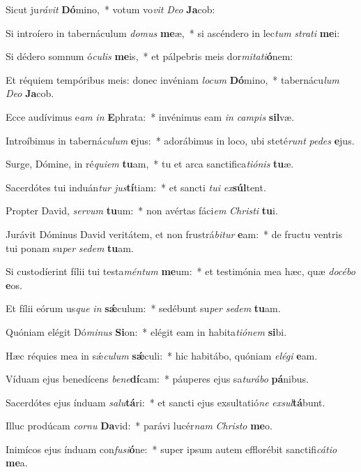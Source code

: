 \item Sicut ju\textit{rá}\textit{vit} \textbf{Dó}mino,~* votum vo\textit{vit} \textit{De}\textit{o} \textbf{Ja}cob:
\item Si introíero in tabernáculum \textit{do}\textit{mus} \textbf{me}æ,~* si ascéndero in lec\textit{tum} \textit{stra}\textit{ti} \textbf{me}i:
\item Si dédero somnum ó\textit{cu}\textit{lis} \textbf{me}is,~* et pálpebris meis dor\textit{mi}\textit{ta}\textit{ti}\textbf{ó}nem:
\item Et réquiem tempóribus meis: donec invéniam \textit{lo}\textit{cum} \textbf{Dó}mino,~* tabernácu\textit{lum} \textit{De}\textit{o} \textbf{Ja}cob.
\item Ecce audívimus e\textit{am} \textit{in} \textbf{E}phrata:~* invénimus eam \textit{in} \textit{cam}\textit{pis} \textbf{sil}væ.
\item Introíbimus in taberná\textit{cu}\textit{lum} \textbf{e}jus:~* adorábimus in loco, ubi steté\textit{runt} \textit{pe}\textit{des} \textbf{e}jus.
\item Surge, Dómine, in ré\textit{qui}\textit{em} \textbf{tu}am,~* tu et arca sanctifica\textit{ti}\textit{ó}\textit{nis} \textbf{tu}æ.
\item Sacerdótes tui induán\textit{tur} \textit{jus}\textbf{tí}tiam:~* et sancti \textit{tu}\textit{i} \textit{ex}\textbf{súl}tent.
\item Propter David, \textit{ser}\textit{vum} \textbf{tu}um:~* non avértas fáci\textit{em} \textit{Chris}\textit{ti} \textbf{tu}i.
\item Jurávit Dóminus David veritátem, et non frustrá\textit{bi}\textit{tur} \textbf{e}am:~* de fructu ventris tui ponam su\textit{per} \textit{se}\textit{dem} \textbf{tu}am.
\item Si custodíerint fílii tui testa\textit{mén}\textit{tum} \textbf{me}um:~* et testimónia mea hæc, quæ \textit{do}\textit{cé}\textit{bo} \textbf{e}os.
\item Et fílii eórum us\textit{que} \textit{in} \textbf{sǽ}culum:~* sedébunt su\textit{per} \textit{se}\textit{dem} \textbf{tu}am.
\item Quóniam elégit Dó\textit{mi}\textit{nus} \textbf{Si}on:~* elégit eam in habita\textit{ti}\textit{ó}\textit{nem} \textbf{si}bi.
\item Hæc réquies mea in sǽ\textit{cu}\textit{lum} \textbf{sǽ}culi:~* hic habitábo, quóniam \textit{e}\textit{lé}\textit{gi} \textbf{e}am.
\item Víduam ejus benedícens \textit{be}\textit{ne}\textbf{dí}cam:~* páuperes ejus sa\textit{tu}\textit{rá}\textit{bo} \textbf{pá}nibus.
\item Sacerdótes ejus índuam \textit{sa}\textit{lu}\textbf{tá}ri:~* et sancti ejus exsultatió\textit{ne} \textit{ex}\textit{sul}\textbf{tá}bunt.
\item Illuc prodúcam \textit{cor}\textit{nu} \textbf{Da}vid:~* parávi lucér\textit{nam} \textit{Chris}\textit{to} \textbf{me}o.
\item Inimícos ejus índuam con\textit{fu}\textit{si}\textbf{ó}ne:~* super ipsum autem efflorébit sanctifi\textit{cá}\textit{ti}\textit{o} \textbf{me}a.
